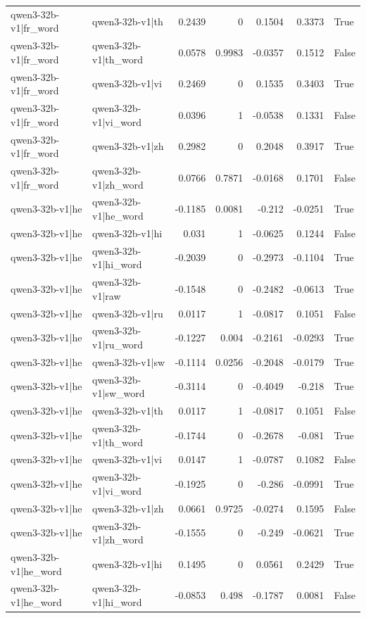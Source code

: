 \begin{table}
\begin{tabular}{l l r r r r l}
qwen3-32b-v1|fr_word & qwen3-32b-v1|th & 0.2439 & 0 & 0.1504 & 0.3373 & True \\
qwen3-32b-v1|fr_word & qwen3-32b-v1|th_word & 0.0578 & 0.9983 & -0.0357 & 0.1512 & False \\
qwen3-32b-v1|fr_word & qwen3-32b-v1|vi & 0.2469 & 0 & 0.1535 & 0.3403 & True \\
qwen3-32b-v1|fr_word & qwen3-32b-v1|vi_word & 0.0396 & 1 & -0.0538 & 0.1331 & False \\
qwen3-32b-v1|fr_word & qwen3-32b-v1|zh & 0.2982 & 0 & 0.2048 & 0.3917 & True \\
qwen3-32b-v1|fr_word & qwen3-32b-v1|zh_word & 0.0766 & 0.7871 & -0.0168 & 0.1701 & False \\
qwen3-32b-v1|he & qwen3-32b-v1|he_word & -0.1185 & 0.0081 & -0.212 & -0.0251 & True \\
qwen3-32b-v1|he & qwen3-32b-v1|hi & 0.031 & 1 & -0.0625 & 0.1244 & False \\
qwen3-32b-v1|he & qwen3-32b-v1|hi_word & -0.2039 & 0 & -0.2973 & -0.1104 & True \\
qwen3-32b-v1|he & qwen3-32b-v1|raw & -0.1548 & 0 & -0.2482 & -0.0613 & True \\
qwen3-32b-v1|he & qwen3-32b-v1|ru & 0.0117 & 1 & -0.0817 & 0.1051 & False \\
qwen3-32b-v1|he & qwen3-32b-v1|ru_word & -0.1227 & 0.004 & -0.2161 & -0.0293 & True \\
qwen3-32b-v1|he & qwen3-32b-v1|sw & -0.1114 & 0.0256 & -0.2048 & -0.0179 & True \\
qwen3-32b-v1|he & qwen3-32b-v1|sw_word & -0.3114 & 0 & -0.4049 & -0.218 & True \\
qwen3-32b-v1|he & qwen3-32b-v1|th & 0.0117 & 1 & -0.0817 & 0.1051 & False \\
qwen3-32b-v1|he & qwen3-32b-v1|th_word & -0.1744 & 0 & -0.2678 & -0.081 & True \\
qwen3-32b-v1|he & qwen3-32b-v1|vi & 0.0147 & 1 & -0.0787 & 0.1082 & False \\
qwen3-32b-v1|he & qwen3-32b-v1|vi_word & -0.1925 & 0 & -0.286 & -0.0991 & True \\
qwen3-32b-v1|he & qwen3-32b-v1|zh & 0.0661 & 0.9725 & -0.0274 & 0.1595 & False \\
qwen3-32b-v1|he & qwen3-32b-v1|zh_word & -0.1555 & 0 & -0.249 & -0.0621 & True \\
qwen3-32b-v1|he_word & qwen3-32b-v1|hi & 0.1495 & 0 & 0.0561 & 0.2429 & True \\
qwen3-32b-v1|he_word & qwen3-32b-v1|hi_word & -0.0853 & 0.498 & -0.1787 & 0.0081 & False \\

\end{tabular}
\end{table}
